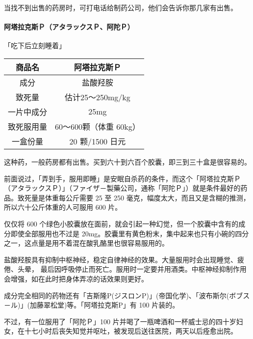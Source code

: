 \documentclass[UTF8]{ctexart}
\begin{document}
当找不到出售的药房时，可打电话给制药公司，他们会告诉你那几家有出售。

\paragraph*{阿塔拉克斯Ｐ（アタラックスＰ、阿陀Ｐ）}

\begin{flushright}
「吃下后立刻睡着」
\end{flushright}

\begin{table}[htbp]
\begin{center}
\begin{tabular}{cc}

\toprule
商品名 & 阿塔拉克斯Ｐ \\
\midrule
成分 & 盐酸羟胺 \\
致死量 & 估计25～250mg/kg \\
一片中成分 & 25mg \\
致死服用量 & 60～600颗（体重 60kg） \\
一盒份量 & 20 颗/1500 日元 \\
\bottomrule
\end{tabular}
\end{center}
\end{table}

这种药，一般药房都有出售。买到六十到六百个胶囊，即三到三十盒是很容易的。

前面说过，「弄到手，服用即睡」是安眠自杀药的条件，而这个「阿塔拉克斯Ｐ（アタラックスＰ）」（ファイザ－製藥公司，通称「阿陀Ｐ」）就是条件最好的药品。致死量是体重每公斤需要 25 至 250 毫克，幅度太大，而且又是含糊的推测，所以六十公斤体重的人可服用 600 片。

仅仅将 600 个绿色小胶囊放在面前，就会引起一种幻觉，但一个胶囊中含有的成分即使全部服用也不过是 20mg。胶囊里有黄色粉末，集中起来也只有小碗的四分之一，这点量是用不着混在酸乳酪里也很容易服用的。

盐酸羟胺具有抑制中枢神经，稳定自律神经的效果。大量服用时会出现睡觉、疲倦、头晕， 最后因呼吸停止而死亡。服用时一定要并用酒类。中枢神经抑制作用会增强，如在此时把身体弄凉的话效果则更好。

成分完全相同的药物还有「吉斯隆P(ジスロンP)」(帝国化学)、「波布斯尔(ボブス－ル)」(加藤翠松堂)等。「阿塔拉克斯P」有 100 片装的。

不过，有一位服用了「阿陀Ｐ」100 片并喝了一瓶啤酒和一杯威士忌的四十岁妇女，在十七小时后丧失知觉并呕吐，被发现后送往医院，两天以后痊愈出院。
\end{document}
